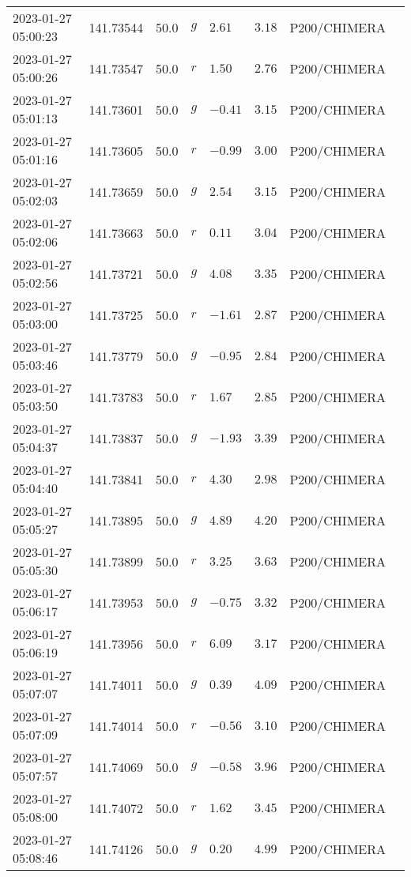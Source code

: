 \documentclass{nature_plusfigure}
\begin{document}
\begin{supplement}
\begin{center}
\begin{longtable}{llllllll}
2023-01-27 05:00:23 & 141.73544 & 50.0 & $g$ & $2.61$ & $3.18$ & P200/CHIMERA &  \\ 
2023-01-27 05:00:26 & 141.73547 & 50.0 & $r$ & $1.50$ & $2.76$ & P200/CHIMERA &  \\ 
2023-01-27 05:01:13 & 141.73601 & 50.0 & $g$ & $-0.41$ & $3.15$ & P200/CHIMERA &  \\ 
2023-01-27 05:01:16 & 141.73605 & 50.0 & $r$ & $-0.99$ & $3.00$ & P200/CHIMERA &  \\ 
2023-01-27 05:02:03 & 141.73659 & 50.0 & $g$ & $2.54$ & $3.15$ & P200/CHIMERA &  \\ 
2023-01-27 05:02:06 & 141.73663 & 50.0 & $r$ & $0.11$ & $3.04$ & P200/CHIMERA &  \\ 
2023-01-27 05:02:56 & 141.73721 & 50.0 & $g$ & $4.08$ & $3.35$ & P200/CHIMERA &  \\ 
2023-01-27 05:03:00 & 141.73725 & 50.0 & $r$ & $-1.61$ & $2.87$ & P200/CHIMERA &  \\ 
2023-01-27 05:03:46 & 141.73779 & 50.0 & $g$ & $-0.95$ & $2.84$ & P200/CHIMERA &  \\ 
2023-01-27 05:03:50 & 141.73783 & 50.0 & $r$ & $1.67$ & $2.85$ & P200/CHIMERA &  \\ 
2023-01-27 05:04:37 & 141.73837 & 50.0 & $g$ & $-1.93$ & $3.39$ & P200/CHIMERA &  \\ 
2023-01-27 05:04:40 & 141.73841 & 50.0 & $r$ & $4.30$ & $2.98$ & P200/CHIMERA &  \\ 
2023-01-27 05:05:27 & 141.73895 & 50.0 & $g$ & $4.89$ & $4.20$ & P200/CHIMERA &  \\ 
2023-01-27 05:05:30 & 141.73899 & 50.0 & $r$ & $3.25$ & $3.63$ & P200/CHIMERA &  \\ 
2023-01-27 05:06:17 & 141.73953 & 50.0 & $g$ & $-0.75$ & $3.32$ & P200/CHIMERA &  \\ 
2023-01-27 05:06:19 & 141.73956 & 50.0 & $r$ & $6.09$ & $3.17$ & P200/CHIMERA &  \\ 
2023-01-27 05:07:07 & 141.74011 & 50.0 & $g$ & $0.39$ & $4.09$ & P200/CHIMERA &  \\ 
2023-01-27 05:07:09 & 141.74014 & 50.0 & $r$ & $-0.56$ & $3.10$ & P200/CHIMERA &  \\ 
2023-01-27 05:07:57 & 141.74069 & 50.0 & $g$ & $-0.58$ & $3.96$ & P200/CHIMERA &  \\ 
2023-01-27 05:08:00 & 141.74072 & 50.0 & $r$ & $1.62$ & $3.45$ & P200/CHIMERA &  \\ 
2023-01-27 05:08:46 & 141.74126 & 50.0 & $g$ & $0.20$ & $4.99$ & P200/CHIMERA &  \\ 

\end{longtable}
\end{center}
\end{supplement}
\end{document}
